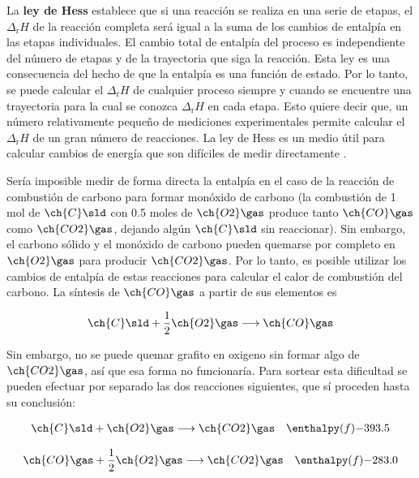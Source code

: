 \newpage

La \textbf{ley de Hess} establece que si una reacción se realiza en una serie de etapas, el $\Delta_{\mathrm{r}}H$ de la reacción completa será igual a la suma de los cambios de entalpía en las etapas individuales. El cambio total de entalpía del proceso es independiente del número de etapas y de la trayectoria que siga la reacción. Esta ley es una consecuencia del hecho de que la entalpía es una función de estado. Por lo tanto, se puede calcular el $\Delta_{\mathrm{r}}H$ de cualquier proceso siempre y cuando se encuentre una trayectoria para la cual se conozca $\Delta_{\mathrm{r}}H$ en cada etapa. Esto quiere decir que, un número relativamente pequeño de mediciones experimentales permite calcular el $\Delta_{\mathrm{r}}H$ de un gran número de reacciones. La ley de Hess es un medio útil para calcular cambios de energía que son difíciles de medir directamente 
\cite{Chang2008}. 

Sería imposible medir de forma directa la entalpía en el caso de la reacción de combustión de carbono para formar monóxido de carbono (la combustión de 1 mol de $\ch{C}\sld$ con 0.5 moles de $\ch{O2}\gas$ produce tanto $\ch{CO}\gas$ como $\ch{CO2}\gas$, dejando algún $\ch{C}\sld$ sin reaccionar). Sin embargo, el carbono sólido y el monóxido de carbono pueden quemarse por completo en $\ch{O2}\gas$ para producir $\ch{CO2}\gas$. Por lo tanto, es posible utilizar los cambios de entalpía de estas reacciones para calcular el calor de combustión del carbono. La síntesis de $\ch{CO}\gas$ a partir de sus elementos es

\begin{equation}
	\ch{C}\sld + \frac{1}{2} \ch{O2}\gas \longrightarrow \ch{CO}\gas
\label{eq:3.9}
\end{equation}

Sin embargo, no se puede quemar grafito en oxigeno sin formar algo de $\ch{CO2}\gas$, así que esa forma no funcionaría. Para sortear esta dificultad se pueden efectuar por separado las dos reacciones siguientes, que sí proceden hasta su conclusión:


\begin{equation}
\begin{aligned}
	& \ch{C}\sld + \ch{O2}\gas \longrightarrow \ch{CO2}\gas & \enthalpy(f){-393.5}
\end{aligned}
\label{eq:3.10}
\end{equation}

\begin{equation}
\begin{aligned}
	& \ch{CO}\gas + \frac{1}{2}\ch{O2}\gas \longrightarrow \ch{CO2}\gas & \enthalpy(f){-283.0}
\end{aligned}
\label{eq:3.11}
\end{equation}

